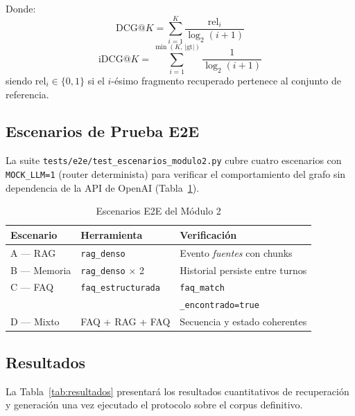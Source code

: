 \documentclass[conference]{IEEEtran}
\newcommand{\code}[1]{\texttt{\small #1}}
\begin{document}
Donde:
\begin{equation}
\mathrm{DCG}@K = \sum_{i=1}^{K} \frac{\mathrm{rel}_i}{\log_2(i+1)}
\label{eq:dcg}
\end{equation}
\begin{equation}
\mathrm{iDCG}@K = \sum_{i=1}^{\min(K,\,|\mathrm{gt}|)} \frac{1}{\log_2(i+1)}
\label{eq:idcg}
\end{equation}
siendo $\mathrm{rel}_i \in \{0,1\}$ si el $i$-ésimo fragmento recuperado
pertenece al conjunto de referencia.

\subsection{Escenarios de Prueba E2E}

La suite \code{tests/e2e/test\_escenarios\_modulo2.py} cubre cuatro escenarios
con \code{MOCK\_LLM=1} (router determinista) para verificar el comportamiento
del grafo sin dependencia de la API de OpenAI (Tabla~\ref{tab:e2e}).

\begin{table}[ht]
\centering
\caption{Escenarios E2E del Módulo 2}
\label{tab:e2e}
\setlength{\tabcolsep}{3pt}
\footnotesize
\begin{tabular}{@{}llp{2.4cm}@{}}
\toprule
\textbf{Escenario} & \textbf{Herramienta} & \textbf{Verificación} \\
\midrule
A — RAG     & \code{rag\_denso}        & Evento \textit{fuentes} con chunks \\
B — Memoria & \code{rag\_denso} × 2   & Historial persiste entre turnos \\
C — FAQ     & \code{faq\_estructurada} & \code{faq\_match}\\
            &                          & \code{\_encontrado=true} \\
D — Mixto   & FAQ + RAG + FAQ          & Secuencia y estado coherentes \\
\bottomrule
\end{tabular}
\normalsize
\end{table}

\subsection{Resultados}

La Tabla~\ref{tab:resultados} presentará los resultados cuantitativos de
recuperación y generación una vez ejecutado el protocolo sobre el corpus
definitivo.
\end{document}
